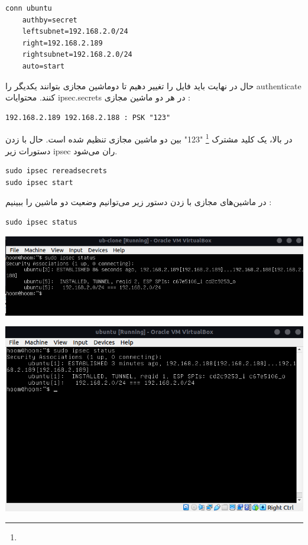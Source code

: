 \begin{enumerate}[label=\alph*)]
\begin{latin}
\begin{lstlisting}
conn ubuntu
    authby=secret
    leftsubnet=192.168.2.0/24
    right=192.168.2.189
    rightsubnet=192.168.2.0/24
    auto=start
\end{lstlisting}
\end{latin}
حال در نهایت باید فایل 
را تغییر دهیم تا دوماشین مجازی بتوانند یکدیگر را 
authenticate کنند.
محتوایات ipsec.secrets در هر دو ماشین مجازی : 


\begin{latin}
\begin{lstlisting}
192.168.2.189 192.168.2.188 : PSK "123"
\end{lstlisting}
\end{latin}
در بالا، یک کلید مشترک 
\footnote{}
"123"
بین دو ماشین مجازی تنظیم شده است.
حال با زدن دستورات زیر ipsec ران می‌شود.
\begin{latin}
\begin{lstlisting}
sudo ipsec rereadsecrets
sudo ipsec start
\end{lstlisting}
\end{latin}
در ماشین‌های مجازی با زدن دستور زیر می‌توانیم وضعیت دو ماشین را ببینیم : 
\begin{latin}
\begin{lstlisting}
sudo ipsec status
\end{lstlisting}
  \end{latin}
  \begin{center}
    \includegraphics[scale=0.5]{pics/ipsec1.png}
  \end{center}
  \begin{center}
    \includegraphics[scale=0.5]{pics/ipsec2.png}
  \end{center}
\end{enumerate}
